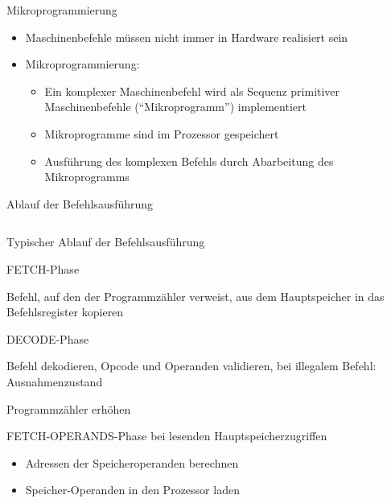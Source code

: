 \documentclass[utf8,9pt]{beamer}
\begin{document}
\begin{frame}{Mikroprogrammierung}{}

\begin{block}{}
\begin{itemize}
\item Maschinenbefehle müssen nicht immer in Hardware realisiert sein
\item Mikroprogrammierung:
  \begin{itemize}
  \item Ein komplexer Maschinenbefehl wird als
       Sequenz primitiver Maschinenbefehle ("`Mikroprogramm"') implementiert
  \item Mikroprogramme sind im Prozessor gespeichert
  \item Ausführung des komplexen Befehls durch Abarbeitung des Mikroprogramms
  \end{itemize}
\end{itemize}
\end{block}

\end{frame}





\begin{frame}{Ablauf der Befehlsausführung}{}
\begin{columns}
   \vspace*{-10mm}
\end{columns}
\end{frame}







\begin{frame}{Typischer Ablauf der Befehlsausführung}{}

\begin{block}{\small FETCH-Phase}
\begin{Itemize}
\item Befehl, auf den der Programmzähler verweist, aus dem Hauptspeicher
   in das Befehlsregister kopieren 
 \end{Itemize}
\end{block}

\begin{block}{\small DECODE-Phase}
\begin{Itemize}
\item Befehl dekodieren, Opcode und Operanden validieren,
   bei illegalem Befehl: Ausnahmenzustand
\item Programmzähler erhöhen
\end{Itemize}
\end{block}
\begin{block}{\small FETCH-OPERANDS-Phase}
 bei lesenden Hauptspeicherzugriffen
\begin{itemize}
  \item Adressen der Speicheroperanden berechnen
  \item Speicher-Operanden in den Prozessor laden
\end{itemize} 
\end{block}
\end{frame}
\end{document}
